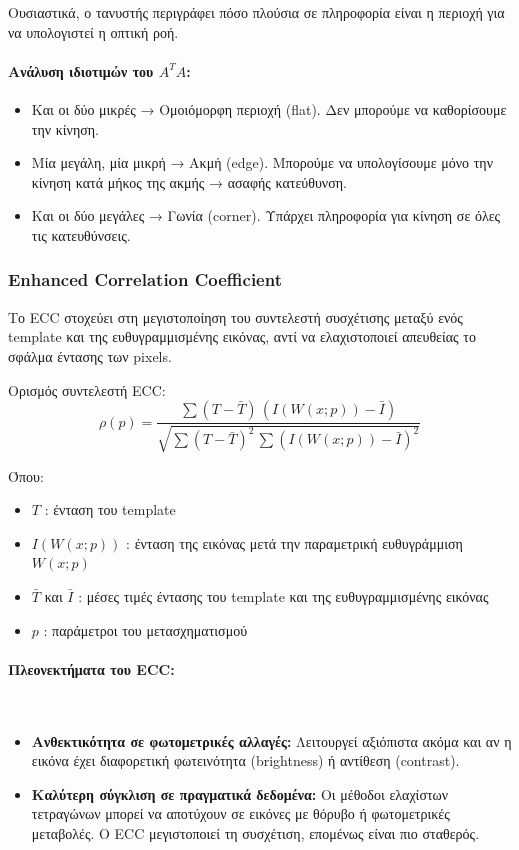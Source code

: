 \documentclass[12pt]{article}
\begin{document}
Ουσιαστικά, ο τανυστής περιγράφει πόσο πλούσια σε πληροφορία είναι η περιοχή για να υπολογιστεί η οπτική ροή.

\paragraph{Ανάλυση ιδιοτιμών του \(A^T A\):}
\begin{itemize}
  \item Και οι δύο μικρές → Ομοιόμορφη περιοχή (flat). Δεν μπορούμε να καθορίσουμε την κίνηση.
  \item Μία μεγάλη, μία μικρή → Ακμή (edge). Μπορούμε να υπολογίσουμε μόνο την κίνηση κατά μήκος της ακμής → ασαφής κατεύθυνση.
  \item Και οι δύο μεγάλες → Γωνία (corner). Υπάρχει πληροφορία για κίνηση σε όλες τις κατευθύνσεις.
\end{itemize}


\subsubsection{Enhanced Correlation Coefficient}
Το ECC στοχεύει στη μεγιστοποίηση του συντελεστή συσχέτισης μεταξύ ενός template και της ευθυγραμμισμένης εικόνας, αντί να ελαχιστοποιεί απευθείας το σφάλμα έντασης των pixels.

Ορισμός συντελεστή ECC:
\begin{equation}
\rho(p) = 
\frac{
\sum (T - \bar{T}) \, (I(W(x;p)) - \bar{I})
}{
\sqrt{\sum (T - \bar{T})^2 \, \sum (I(W(x;p)) - \bar{I})^2}
}
\end{equation}

Όπου:
\begin{itemize}
  \item $T$ : ένταση του template
  \item $I(W(x;p))$ : ένταση της εικόνας μετά την παραμετρική ευθυγράμμιση $W(x;p)$
  \item $\bar{T}$ και $\bar{I}$ : μέσες τιμές έντασης του template και της ευθυγραμμισμένης εικόνας
  \item $p$ : παράμετροι του μετασχηματισμού
\end{itemize}

\paragraph{Πλεονεκτήματα του ECC:}
\mbox{}\\
\begin{itemize}
  \item \textbf{Ανθεκτικότητα σε φωτομετρικές αλλαγές:} Λειτουργεί αξιόπιστα ακόμα και αν η εικόνα έχει διαφορετική φωτεινότητα (brightness) ή αντίθεση (contrast).
  \item \textbf{Καλύτερη σύγκλιση σε πραγματικά δεδομένα:} Οι μέθοδοι ελαχίστων τετραγώνων μπορεί να αποτύχουν σε εικόνες με θόρυβο ή φωτομετρικές μεταβολές. Ο ECC μεγιστοποιεί τη συσχέτιση, επομένως είναι πιο σταθερός.
\end{itemize}
\end{document}
